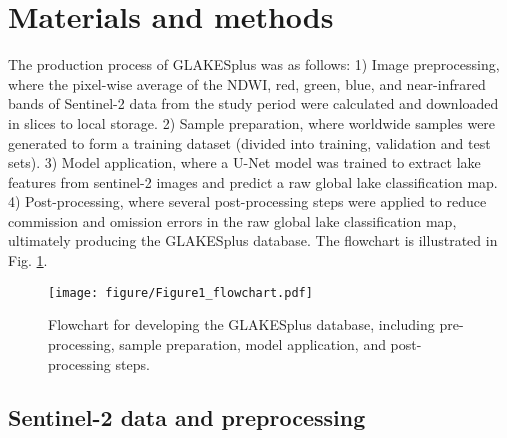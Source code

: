\documentclass[preprint,12pt,authoryear]{elsarticle}
\begin{document}
\section{Materials and methods}
\label{sec2}
The production process of GLAKESplus was as follows: 1) Image preprocessing, where the pixel-wise average of the NDWI, red, green, blue, and near-infrared bands of Sentinel-2 data from the study period were calculated and downloaded in slices to local storage. 2) Sample preparation, where worldwide samples were generated to form a training dataset (divided into training, validation and test sets). 3) Model application, where a U-Net model was trained to extract lake features from sentinel-2 images and predict a raw global lake classification map. 4) Post-processing, where several post-processing steps were applied to reduce commission and omission errors in the raw global lake classification map, ultimately producing the GLAKESplus database. The flowchart is illustrated in Fig. \ref{fig:Fig1}.

\begin{figure}[h]
    \centering
    \texttt{[image: figure/Figure1\_flowchart.pdf]}
    \caption{Flowchart for developing the GLAKESplus database, including pre-processing, sample preparation, model application, and post-processing steps.}
    \label{fig:Fig1}
\end{figure}

\subsection{Sentinel-2 data and preprocessing}
\label{subsec1}
\end{document}
